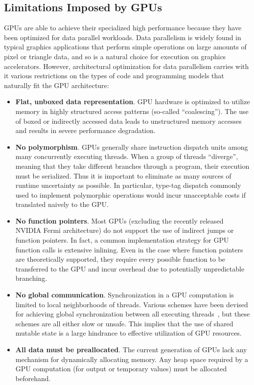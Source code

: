 \documentclass[preprint]{sigplanconf}
\begin{document}
\subsection{Limitations Imposed by GPUs}
\label{GPULimitations}
GPUs are able to achieve their specialized high performance because they have been optimized for data parallel workloads. Data parallelism is widely found in typical graphics applications that perform simple operations on large amounts of pixel or triangle data, and so is a natural choice for execution on graphics accelerators.  However, architectural optimization for data parallelism carries with it various restrictions on the types of code and programming models that naturally fit the GPU architecture:

\begin{itemize}
\item \textbf{Flat, unboxed data representation}. GPU hardware is optimized to utilize memory in highly structured access patterns (so-called ``coalescing''). The use of boxed or indirectly accessed data leads to unstructured memory accesses and results in severe performance degradation.

\item \textbf{No polymorphism}. GPUs generally share instruction dispatch units among many concurrently executing threads. When a group of threads ``diverge'', meaning that they take different branches through a program, their execution must be serialized. Thus it is important to eliminate as many sources of runtime uncertainty as possible. In particular, type-tag dispatch commonly used to implement polymorphic operations would incur unacceptable costs if translated naively to the GPU.

\item \textbf {No function pointers}. Most GPUs (excluding the recently released NVIDIA Fermi architecture) do not support the use of indirect jumps or function pointers. In fact, a common implementation strategy for GPU function calls is extensive inlining. Even in the case where function pointers are theoretically supported, they require every possible function to be transferred to the GPU and incur overhead due to potentially unpredictable branching.

\item \textbf{No global communication}. Synchronization in a GPU computation is limited to local neighborhoods of threads. Various schemes have been devised for achieving global synchronization between all executing threads~\cite{feng10}, but these schemes are all either slow or unsafe. This implies that the use of shared mutable state is a large hindrance to effective utilization of GPU resources.

\item \textbf{All data must be preallocated}. The current generation of GPUs lack any mechanism for dynamically allocating memory. Any heap space required by a GPU computation (for output or temporary values) must be allocated beforehand.
\end{itemize}
\end{document}
